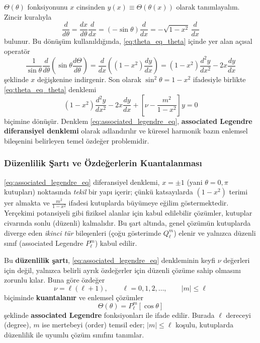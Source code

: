\medskip
\noindent
$\Theta(\theta)$ fonksiyonunu $x$ cinsinden $y(x)\equiv \Theta(\theta(x))$ olarak tanımlayalım.
Zincir kuralıyla
\begin{equation}
\frac{d}{d\theta}
=
\frac{dx}{d\theta}\frac{d}{dx}
=
(-\sin\theta)\frac{d}{dx}
=
-\sqrt{1-x^2}\,\frac{d}{dx}
\label{eq:d_dtheta_to_d_dx}
\end{equation}
bulunur. Bu dönüşüm kullanıldığında, \eqref{eq:theta_eq_theta} içinde yer alan açısal operatör
\begin{equation}
\frac{1}{\sin\theta}\frac{d}{d\theta}\left(\sin\theta\frac{d\Theta}{d\theta}\right)
=
\frac{d}{dx}\left((1-x^2)\frac{dy}{dx}\right)
=
(1-x^2)\frac{d^2y}{dx^2}-2x\frac{dy}{dx}
\label{eq:legendre_operator}
\end{equation}
şeklinde $x$ değişkenine indirgenir. Son olarak $\sin^2\theta=1-x^2$ ifadesiyle birlikte
\eqref{eq:theta_eq_theta} denklemi
\begin{equation}
(1-x^2)\frac{d^2 y}{dx^2}
-2x\frac{dy}{dx}
+
\left[\nu-\frac{m^2}{1-x^2}\right]y
=0
\label{eq:associated_legendre_eq}
\end{equation}
biçimine dönüşür. Denklem \eqref{eq:associated_legendre_eq}, \textbf{associated Legendre
diferansiyel denklemi} olarak adlandırılır ve küresel harmonik bazın enlemsel
bileşenini belirleyen temel özdeğer problemidir.

\subsubsection{Düzenlilik Şartı ve Özdeğerlerin Kuantalanması}
\label{subsubsec:regularity_quantization}

\eqref{eq:associated_legendre_eq} diferansiyel denklemi, $x=\pm 1$ (yani $\theta=0,\pi$ kutupları)
noktasında \emph{tekil} bir yapı içerir; çünkü katsayılarda $(1-x^2)$ terimi yer almakta ve
$\frac{m^2}{1-x^2}$ ifadesi kutuplarda büyümeye eğilim göstermektedir. Yerçekimi potansiyeli gibi
fiziksel alanlar için kabul edilebilir çözümler, kutuplar civarında sonlu (düzenli) kalmalıdır.
Bu şart altında, genel çözümün kutuplarda diverge eden \emph{ikinci tür} bileşenleri (çoğu gösterimde $Q_\ell^m$)
elenir ve yalnızca düzenli sınıf (associated Legendre $P_\ell^m$) kabul edilir.

\medskip
\noindent
Bu \textbf{düzenlilik şartı}, \eqref{eq:associated_legendre_eq} denkleminin keyfi $\nu$ değerleri için değil,
yalnızca belirli ayrık özdeğerler için düzenli çözüme sahip olmasını zorunlu kılar. Buna göre özdeğer
\begin{equation}
\nu=\ell(\ell+1),
\qquad
\ell=0,1,2,\dots,
\qquad
|m|\le \ell
\label{eq:eigenvalues}
\end{equation}
biçiminde \textbf{kuantalanır} ve enlemsel çözümler
\begin{equation}
\Theta(\theta)=P_\ell^m[\cos\theta]
\label{eq:theta_solution_associated}
\end{equation}
şeklinde \textbf{associated Legendre} fonksiyonları ile ifade edilir. Burada $\ell$ dereceyi (degree),
$m$ ise mertebeyi (order) temsil eder; $|m|\le \ell$ koşulu, kutuplarda düzenlilik ile uyumlu çözüm sınıfını tanımlar.

